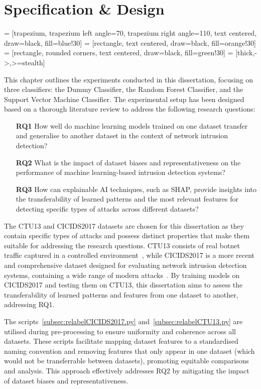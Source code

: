 \chapter{Specification \& Design}

 = [trapezium, trapezium left angle=70, trapezium right angle=110, text centered, draw=black, fill=blue!30]
 = [rectangle, text centered, draw=black, fill=orange!30]
 = [rectangle, rounded corners, text centered, draw=black, fill=green!30]
 = [thick,->,>=stealth]

This chapter outlines the experiments conducted in this dissertation, focusing on three classifiers: the Dummy Classifier, the Random Forest Classifier, and the Support Vector Machine Classifier. The experimental setup has been designed based on a thorough literature review to address the following research questions:

\begin{enumerate}
\item[\textbf{RQ1}] How well do machine learning models trained on one dataset transfer and generalise to another dataset in the context of network intrusion detection?
\item[\textbf{RQ2}] What is the impact of dataset biases and representativeness on the performance of machine learning-based intrusion detection systems?
\item[\textbf{RQ3}] How can explainable AI techniques, such as SHAP, provide insights into the transferability of learned patterns and the most relevant features for detecting specific types of attacks across different datasets?
\end{enumerate}

The CTU13 and CICIDS2017 datasets are chosen for this dissertation as they contain specific types of attacks and possess distinct properties that make them suitable for addressing the research questions. CTU13 consists of real botnet traffic captured in a controlled environment~\cite{garcia2014empirical}, while CICIDS2017 is a more recent and comprehensive dataset designed for evaluating network intrusion detection systems, containing a wide range of modern attacks~\cite{sharafaldin2018toward}. By training models on CICIDS2017 and testing them on CTU13, this dissertation aims to assess the transferability of learned patterns and features from one dataset to another, addressing RQ1.

The scripts~\ref{subsec:relabelCICIDS2017.py} and~\ref{subsec:relabelCTU13.py} are utilised during pre-processing to ensure uniformity and coherence across all datasets. These scripts facilitate mapping dataset features to a standardised naming convention and removing features that only appear in one dataset (which would not be transferrable between datasets), promoting equitable comparisons and analysis. This approach effectively addresses RQ2 by mitigating the impact of dataset biases and representativeness.

